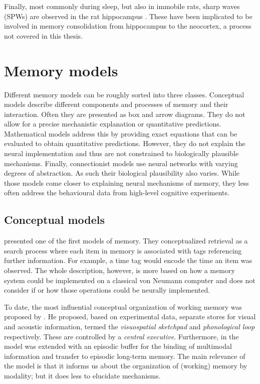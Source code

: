 Finally, most commonly during sleep, but also in immobile rats, sharp waves (SPWs) are observed in the rat hippocampus \parencite{chrobak1994,girardeau2009}.
These have been implicated to be involved in memory consolidation from hippocampus to the neocortex, a process not covered in this thesis.


\section{Memory models}
Different memory models can be roughly sorted into three classes.
Conceptual models describe different components and processes of memory and their interaction.
Often they are presented as box and arrow diagrams.
They do not allow for a precise mechanistic explanation or quantitative predictions.
Mathematical models address this by providing exact equations that can be evaluated to obtain quantitative predictions.
However, they do not explain the neural implementation and thus are not constrained to biologically plausible mechanisms.
Finally, connectionist models use neural networks with varying degrees of abstraction.
As such their biological plausibility also varies.
While those models come closer to explaining neural mechanisms of memory, they less often address the behavioural data from high-level cognitive experiments.

\subsection{Conceptual models}
\Textcite{Yntema1963} presented one of the first models of memory.
They conceptualized retrieval as a search process where each item in memory is associated with tags referencing further information.
For example, a time tag would encode the time an item was observed.
The whole description, however, is more based on how a memory system could be implemented on a classical von Neumann computer and does not consider if or how those operations could be neurally implemented.

To date, the most influential conceptual organization of working memory was proposed by \textcite{Baddeley1986}.
He proposed, based on experimental data, separate stores for visual and acoustic information, termed the \emph{visuospatial sketchpad} and \emph{phonological loop} respectively.
These are controlled by a \emph{central executive}.
Furthermore, in \textcite{Baddeley2000} the model was extended with an episodic buffer for the binding of multimodal information and transfer to episodic long-term memory.
The main relevance of the model is that it informs us about the organization of (working) memory by modality; but it does less to elucidate mechanisms.

